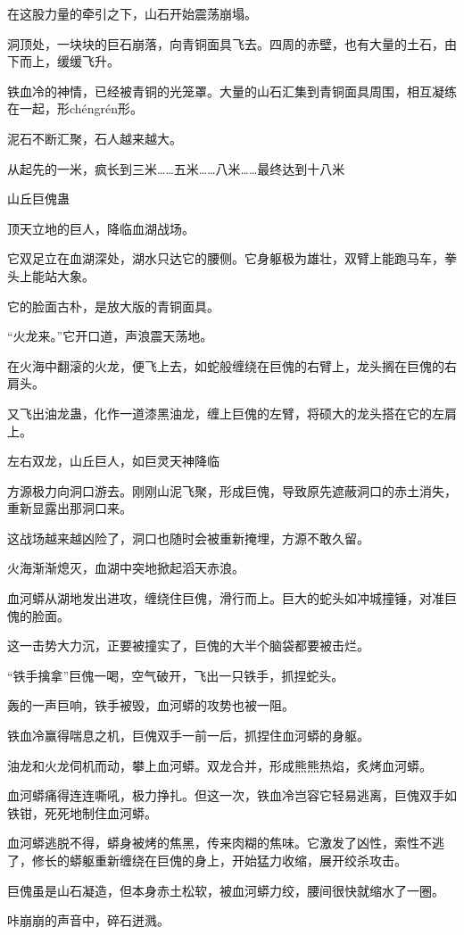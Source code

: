 \begin{this_body}
在这股力量的牵引之下，山石开始震荡崩塌。

洞顶处，一块块的巨石崩落，向青铜面具飞去。四周的赤壁，也有大量的土石，由下而上，缓缓飞升。

铁血冷的神情，已经被青铜的光笼罩。大量的山石汇集到青铜面具周围，相互凝练在一起，形chéngrén形。

泥石不断汇聚，石人越来越大。

从起先的一米，疯长到三米……五米……八米……最终达到十八米

山丘巨傀蛊

顶天立地的巨人，降临血湖战场。

它双足立在血湖深处，湖水只达它的腰侧。它身躯极为雄壮，双臂上能跑马车，拳头上能站大象。

它的脸面古朴，是放大版的青铜面具。

“火龙来。”它开口道，声浪震天荡地。

在火海中翻滚的火龙，便飞上去，如蛇般缠绕在巨傀的右臂上，龙头搁在巨傀的右肩头。

又飞出油龙蛊，化作一道漆黑油龙，缠上巨傀的左臂，将硕大的龙头搭在它的左肩上。

左右双龙，山丘巨人，如巨灵天神降临

方源极力向洞口游去。刚刚山泥飞聚，形成巨傀，导致原先遮蔽洞口的赤土消失，重新显露出那洞口来。

这战场越来越凶险了，洞口也随时会被重新掩埋，方源不敢久留。

火海渐渐熄灭，血湖中突地掀起滔天赤浪。

血河蟒从湖地发出进攻，缠绕住巨傀，滑行而上。巨大的蛇头如冲城撞锤，对准巨傀的脸面。

这一击势大力沉，正要被撞实了，巨傀的大半个脑袋都要被击烂。

“铁手擒拿”巨傀一喝，空气破开，飞出一只铁手，抓捏蛇头。

轰的一声巨响，铁手被毁，血河蟒的攻势也被一阻。

铁血冷赢得喘息之机，巨傀双手一前一后，抓捏住血河蟒的身躯。

油龙和火龙伺机而动，攀上血河蟒。双龙合并，形成熊熊热焰，炙烤血河蟒。

血河蟒痛得连连嘶吼，极力挣扎。但这一次，铁血冷岂容它轻易逃离，巨傀双手如铁钳，死死地制住血河蟒。

血河蟒逃脱不得，蟒身被烤的焦黑，传来肉糊的焦味。它激发了凶性，索性不逃了，修长的蟒躯重新缠绕在巨傀的身上，开始猛力收缩，展开绞杀攻击。

巨傀虽是山石凝造，但本身赤土松软，被血河蟒力绞，腰间很快就缩水了一圈。

咔崩崩的声音中，碎石迸溅。


\end{this_body}
